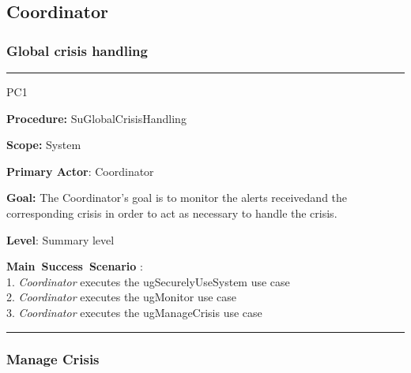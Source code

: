 \subsection{Coordinator}

\subsubsection{Global crisis handling}
\vspace{0.5cm}
\hrule
\begin{lyxlist}{PC1}
\small{
\item [\textbf{Procedure:}] SuGlobalCrisisHandling
\item [\textbf{Scope:}] System
\item [\textbf{Primary Actor}:] Coordinator
\item [\textbf{Goal:}] The Coordinator’s goal is to monitor the alerts
receivedand the corresponding crisis in order to act as necessary to handle the
crisis.
\item [\textbf{Level}:] Summary level
\item [\textbf{Main~Success~Scenario}]:\\
1. \emph{Coordinator} executes the ugSecurelyUseSystem use case\\
2. \emph{Coordinator} executes the ugMonitor use case\\
3. \emph{Coordinator} executes the ugManageCrisis use case\\

}

\end{lyxlist}
\hrule
\vspace{0.5cm}

\subsubsection{Manage Crisis}

